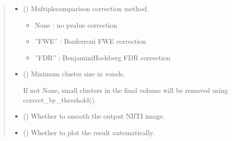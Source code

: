 \documentclass[letterpaper,10pt,english]{sphinxhowto}
\begin{document}
\begin{fulllineitems}
\begin{quote}
\begin{description}
\begin{itemize}
\sphinxAtStartPar
For correlation maps, this can be used as an r\sphinxhyphen{}value threshold.
For statistical maps, this is usually None.


\item {} 
\sphinxAtStartPar
{} (\sphinxstyleliteralemphasis{\sphinxupquote{, }}\sphinxstyleliteralemphasis{\sphinxupquote{, }}\sphinxstyleliteralemphasis{\sphinxupquote{, }}) \textendash{} 
\sphinxAtStartPar
Multiple\sphinxhyphen{}comparison correction method.
\begin{itemize}
\item {} 
\sphinxAtStartPar
None : no p\sphinxhyphen{}value correction

\item {} 
\sphinxAtStartPar
”FWE” : Bonferroni FWE correction

\item {} 
\sphinxAtStartPar
”FDR” : Benjamini\sphinxhyphen{}Hochberg FDR correction

\end{itemize}


\item {} 
\sphinxAtStartPar
{} (\sphinxstyleliteralemphasis{\sphinxupquote{, }}) \textendash{} 
\sphinxAtStartPar
Minimum cluster size in voxels.

\sphinxAtStartPar
If not None, small clusters in the final volume will be removed using
correct\_by\_threshold().


\item {} 
\sphinxAtStartPar
{} (\sphinxstyleliteralemphasis{\sphinxupquote{, }}) \textendash{} Whether to smooth the output NIfTI image.

\item {} 
\sphinxAtStartPar
{} (\sphinxstyleliteralemphasis{\sphinxupquote{, }}) \textendash{} Whether to plot the result automatically.


\end{itemize}
\end{description}
\end{quote}
\end{fulllineitems}
\end{document}
